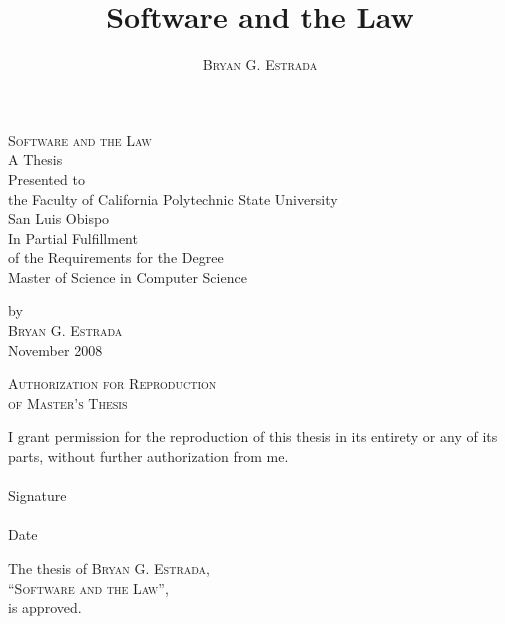 \documentclass[12pt]{report}
\newcommand{\thetitle}{Software and the Law}
\newcommand{\theauthor}{\textsc{Bryan G. Estrada}}
\newcommand{\theuniversity}{California Polytechnic State University}
\newcommand{\thecity}{San Luis Obispo}
\newcommand{\thedegree}{Master of Science in Computer Science}
\newcommand{\thedate}{November 2008}
\begin{document}
  

\title{\thetitle}  
\author{\theauthor}  

\doublespace  


\begin{titlepage}  
\thispagestyle{empty}  
\begin{center}  

\textsc{\LARGE \thetitle}\\[4cm]  

A Thesis\\  
Presented to\\  
the Faculty of \theuniversity\\  
\thecity\\[4cm]  

In Partial Fulfillment\\  
of the Requirements for the Degree\\  
\thedegree  

\vfill  
by\\  
\theauthor\\  
\thedate  
\end{center}  

\end{titlepage}  

\begin{center}  
\textsc{\large Authorization for Reproduction\\of Master's Thesis}\\[3cm]  
\end{center}  

\noindent I grant permission for the reproduction of this thesis in its entirety  
or any of its parts, without further authorization from me.\\[4cm]  

\singlespace  
\noindent\makebox[4in]{\hrulefill}\\  
Signature\\[2cm]  

\noindent\makebox[4in]{\hrulefill}\\  
Date  
\doublespace  
\newpage  

\begin{center}  
The thesis of \theauthor,\\  
``\textsc{\large \thetitle}'',\\  
is approved.\\[4cm]  
\end{center}  
\end{document}
